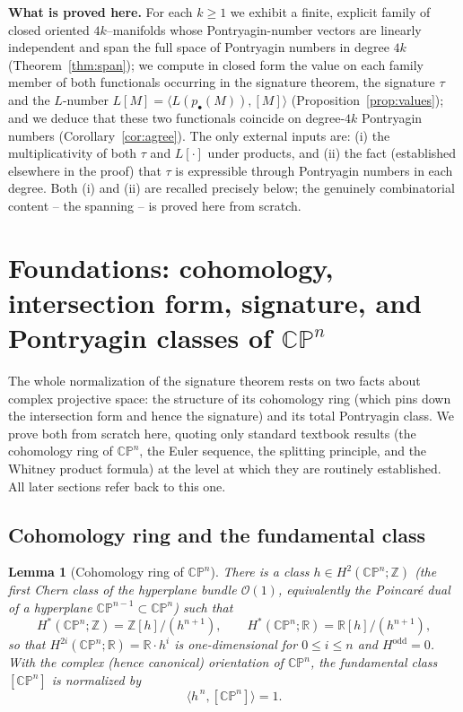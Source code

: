 \documentclass[12pt]{article}
\newtheorem{lemma}{Lemma}
\theoremstyle{definition}
\begin{document}
\medskip

\noindent
\textbf{What is proved here.}
For each $k\ge 1$ we exhibit a finite, explicit family of closed oriented
$4k$--manifolds whose Pontryagin-number vectors are linearly independent and span the
full space of Pontryagin numbers in degree $4k$ (Theorem~\ref{thm:span}); we compute in
closed form the value on each family member of both functionals occurring in the
signature theorem, the signature $\tau$ and the $L$-number
$L[M]=\langle L(p_\bullet(M)),[M]\rangle$ (Proposition~\ref{prop:values}); and we deduce
that these two functionals coincide on degree-$4k$ Pontryagin numbers
(Corollary~\ref{cor:agree}).  The only external inputs are: (i) the multiplicativity of
both $\tau$ and $L[\cdot]$ under products, and (ii) the fact (established elsewhere in
the proof) that $\tau$ is expressible through Pontryagin numbers in each degree.  Both
(i) and (ii) are recalled precisely below; the genuinely combinatorial content -- the
spanning -- is proved here from scratch.

\bigskip


\section{Foundations: cohomology, intersection form, signature, and Pontryagin
classes of $\mathbb{CP}^{n}$}\label{sec:found}

The whole normalization of the signature theorem rests on two facts about complex
projective space: the structure of its cohomology ring (which pins down the intersection
form and hence the signature) and its total Pontryagin class.  We prove both from
scratch here, quoting only standard textbook results (the cohomology ring of
$\mathbb{CP}^n$, the Euler sequence, the splitting principle, and the Whitney product
formula) at the level at which they are routinely established.  All later sections refer
back to this one.

\subsection*{Cohomology ring and the fundamental class}

\begin{lemma}[Cohomology ring of $\mathbb{CP}^n$]\label{lem:cpring}
There is a class $h\in H^2(\mathbb{CP}^n;\mathbb{Z})$ (the first Chern class of the
hyperplane bundle $\mathcal{O}(1)$, equivalently the Poincar\'e dual of a hyperplane
$\mathbb{CP}^{n-1}\subset\mathbb{CP}^n$) such that
\[
H^*(\mathbb{CP}^n;\mathbb{Z})=\mathbb{Z}[h]/(h^{n+1}),
\qquad
H^*(\mathbb{CP}^n;\mathbb{R})=\mathbb{R}[h]/(h^{n+1}),
\]
so that $H^{2i}(\mathbb{CP}^n;\mathbb{R})=\mathbb{R}\cdot h^i$ is one-dimensional for
$0\le i\le n$ and $H^{\mathrm{odd}}=0$.  With the complex (hence canonical) orientation of
$\mathbb{CP}^n$, the fundamental class $[\mathbb{CP}^n]$ is normalized by
\[
\big\langle h^{\,n},[\mathbb{CP}^n]\big\rangle=1.
\tag{$\ast$}\label{eq:topdeg}
\]
\end{lemma}
\end{document}
